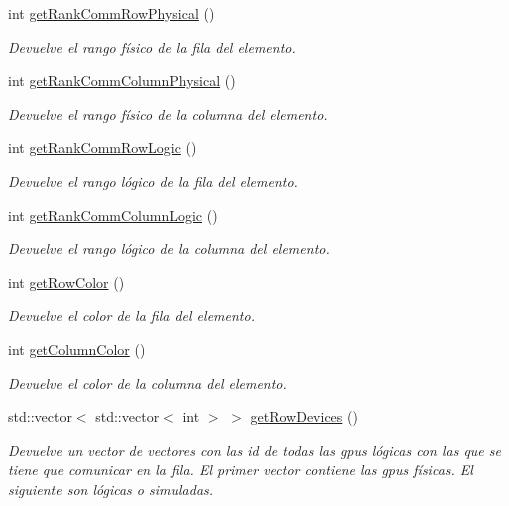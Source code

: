 \begin{DoxyCompactItemize}
int \hyperlink{classCommSummaElement_a8e621902bac457bd3e476967a9aa25f0}{get\+Rank\+Comm\+Row\+Physical} ()
\begin{DoxyCompactList}\small\item\em Devuelve el rango físico de la fila del elemento. \end{DoxyCompactList}\item 
int \hyperlink{classCommSummaElement_ad5851a000c6ef04b289e624e7c23ba33}{get\+Rank\+Comm\+Column\+Physical} ()
\begin{DoxyCompactList}\small\item\em Devuelve el rango físico de la columna del elemento. \end{DoxyCompactList}\item 
int \hyperlink{classCommSummaElement_a6fbf409dcbcc262bdc3d9cddc85b821c}{get\+Rank\+Comm\+Row\+Logic} ()
\begin{DoxyCompactList}\small\item\em Devuelve el rango lógico de la fila del elemento. \end{DoxyCompactList}\item 
int \hyperlink{classCommSummaElement_a9b3617d9994b3ac8e82f9bcda5680b61}{get\+Rank\+Comm\+Column\+Logic} ()
\begin{DoxyCompactList}\small\item\em Devuelve el rango lógico de la columna del elemento. \end{DoxyCompactList}\item 
int \hyperlink{classCommSummaElement_a0b58caefd8a5a99cd5f4eef2202668d4}{get\+Row\+Color} ()
\begin{DoxyCompactList}\small\item\em Devuelve el color de la fila del elemento. \end{DoxyCompactList}\item 
int \hyperlink{classCommSummaElement_acdd065590e6a11a9cdd0d16034d9e7cf}{get\+Column\+Color} ()
\begin{DoxyCompactList}\small\item\em Devuelve el color de la columna del elemento. \end{DoxyCompactList}\item 
std\+::vector$<$ std\+::vector$<$ int $>$ $>$ \hyperlink{classCommSummaElement_a9e93a318fd8866b05b57cc951d8bf751}{get\+Row\+Devices} ()
\begin{DoxyCompactList}\small\item\em Devuelve un vector de vectores con las id de todas las gpus lógicas con las que se tiene que comunicar en la fila. El primer vector contiene las gpus físicas. El siguiente son lógicas o simuladas. \end{DoxyCompactList}\item 

\end{DoxyCompactItemize}
